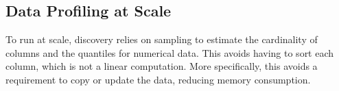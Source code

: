 %
%
%
%
%

\subsection{Data Profiling at Scale}

To run at scale, discovery relies on sampling to estimate the cardinality of
columns and the quantiles for numerical data. This avoids having to sort each
column, which is not a linear computation.  More specifically, this avoids a
requirement to copy or update the data, reducing memory consumption.

